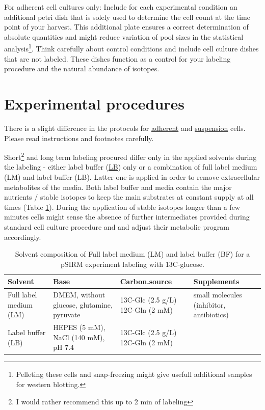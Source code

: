 \documentclass[]{book}
\let\rmarkdownfootnote\footnote%
\def\footnote{\protect\rmarkdownfootnote}
\theoremstyle{definition}
\theoremstyle{definition}
\theoremstyle{definition}
\theoremstyle{remark}
\begin{document}
For adherent cell cultures only: Include for each experimental condition
an additional petri dish that is solely used to determine the cell count
at the time point of your harvest. This additional plate ensures a
correct determination of absolute quantities and might reduce variation
of pool sizes in the statistical analysis\footnote{Pelleting these cells
  and snap-freezing might give usefull additional samples for western
  blotting.}. Think carefully about control conditions and include cell
culture dishes that are not labeled. These dishes function as a control
for your labeling procedure and the natural abundance of isotopes.

\section{Experimental procedures}\label{experimental-procedures}

There is a slight difference in the protocols for
\protect\hyperlink{psirm:adherent}{adherent} and
\protect\hyperlink{psirm:suspension}{suspension} cells. Please read
instructions and footnotes carefully.

Short\footnote{I would rather recommend this up to 2 min of labeling}
and long term labeling procured differ only in the applied solvents
during the labeling - either label buffer
(\protect\hyperlink{washingbuffer}{LB}) only or a combination of full
label medium (LM) and label buffer (LB). Latter one is applied in order
to remove extracellular metabolites of the media. Both label buffer and
media contain the major nutrients / stable isotopes to keep the main
substrates at constant supply at all times (Table \ref{tab:solvent}).
During the application of stable isotopes longer than a few minutes
cells might sense the absence of further intermediates provided during
standard cell culture procedure and and adjust their metabolic program
accordingly.

\begin{table}[t]

\caption{\label{tab:solvent}Solvent composition of Full label medium (LM) and label buffer (BF) for a pSIRM experiment labeling with 13C-glucose.}
\centering
\begin{tabular}{llll}
\toprule
Solvent & Base & Carbon.source & Supplements\\
\midrule
Full label medium (LM) & DMEM, without glucose, glutamine, pyruvate & 13C-Glc (2.5 g/L)
12C-Gln (2 mM) & small molecules 
(inhibitor, antibiotics)\\
Label buffer (LB) & HEPES (5 mM), NaCl (140 mM), pH 7.4 & 13C-Glc (2.5 g/L)
12C-Gln (2 mM) & \\
\bottomrule
\end{tabular}
\end{table}
\end{document}
